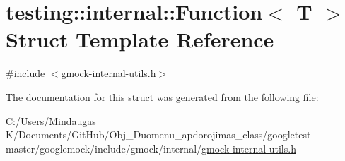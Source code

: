 \hypertarget{structtesting_1_1internal_1_1_function}{}\section{testing\+::internal\+::Function$<$ T $>$ Struct Template Reference}
\label{structtesting_1_1internal_1_1_function}


{\ttfamily \#include $<$gmock-\/internal-\/utils.\+h$>$}



The documentation for this struct was generated from the following file\+:\begin{DoxyCompactItemize}
\item 
C\+:/\+Users/\+Mindaugas K/\+Documents/\+Git\+Hub/\+Obj\+\_\+\+Duomenu\+\_\+apdorojimas\+\_\+class/googletest-\/master/googlemock/include/gmock/internal/\mbox{\hyperlink{googletest-master_2googlemock_2include_2gmock_2internal_2gmock-internal-utils_8h}{gmock-\/internal-\/utils.\+h}}\end{DoxyCompactItemize}
